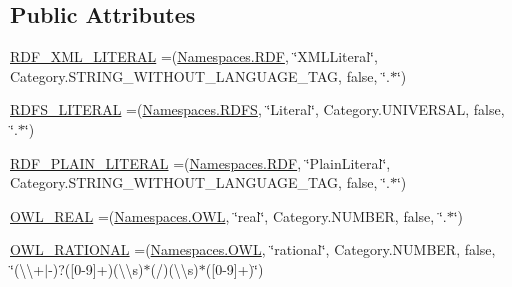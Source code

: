 \subsection*{Public Attributes}
\begin{DoxyCompactItemize}
\item 
\hyperlink{enumorg_1_1semanticweb_1_1owlapi_1_1vocab_1_1_o_w_l2_datatype_a7d12eb71e328a268cb0e6e4f4ebc2231}{R\-D\-F\-\_\-\-X\-M\-L\-\_\-\-L\-I\-T\-E\-R\-A\-L} =(\hyperlink{enumorg_1_1semanticweb_1_1owlapi_1_1vocab_1_1_namespaces_a0d1c7991e82e2b5c495bb87f1123ce30}{Namespaces.\-R\-D\-F}, \char`\"{}X\-M\-L\-Literal\char`\"{}, Category.\-S\-T\-R\-I\-N\-G\-\_\-\-W\-I\-T\-H\-O\-U\-T\-\_\-\-L\-A\-N\-G\-U\-A\-G\-E\-\_\-\-T\-A\-G, false, \char`\"{}.$\ast$\char`\"{})
\item 
\hyperlink{enumorg_1_1semanticweb_1_1owlapi_1_1vocab_1_1_o_w_l2_datatype_a4c24cef892d78edf3441707250688e38}{R\-D\-F\-S\-\_\-\-L\-I\-T\-E\-R\-A\-L} =(\hyperlink{enumorg_1_1semanticweb_1_1owlapi_1_1vocab_1_1_namespaces_a64d32d1177b8a61cc6da656defd88a5a}{Namespaces.\-R\-D\-F\-S}, \char`\"{}Literal\char`\"{}, Category.\-U\-N\-I\-V\-E\-R\-S\-A\-L, false, \char`\"{}.$\ast$\char`\"{})
\item 
\hyperlink{enumorg_1_1semanticweb_1_1owlapi_1_1vocab_1_1_o_w_l2_datatype_a9c2f197109cd73dfe3f0f251854db4c9}{R\-D\-F\-\_\-\-P\-L\-A\-I\-N\-\_\-\-L\-I\-T\-E\-R\-A\-L} =(\hyperlink{enumorg_1_1semanticweb_1_1owlapi_1_1vocab_1_1_namespaces_a0d1c7991e82e2b5c495bb87f1123ce30}{Namespaces.\-R\-D\-F}, \char`\"{}Plain\-Literal\char`\"{}, Category.\-S\-T\-R\-I\-N\-G\-\_\-\-W\-I\-T\-H\-O\-U\-T\-\_\-\-L\-A\-N\-G\-U\-A\-G\-E\-\_\-\-T\-A\-G, false, \char`\"{}.$\ast$\char`\"{})
\item 
\hyperlink{enumorg_1_1semanticweb_1_1owlapi_1_1vocab_1_1_o_w_l2_datatype_ae1bd623e8a3b1299192ee8ef7b89fe1f}{O\-W\-L\-\_\-\-R\-E\-A\-L} =(\hyperlink{enumorg_1_1semanticweb_1_1owlapi_1_1vocab_1_1_namespaces_a2fcb537074d9307ef1356ffb6a5bd6f4}{Namespaces.\-O\-W\-L}, \char`\"{}real\char`\"{}, Category.\-N\-U\-M\-B\-E\-R, false, \char`\"{}.$\ast$\char`\"{})
\item 
\hyperlink{enumorg_1_1semanticweb_1_1owlapi_1_1vocab_1_1_o_w_l2_datatype_a1a117f158c9e72c94db52c28b25d6407}{O\-W\-L\-\_\-\-R\-A\-T\-I\-O\-N\-A\-L} =(\hyperlink{enumorg_1_1semanticweb_1_1owlapi_1_1vocab_1_1_namespaces_a2fcb537074d9307ef1356ffb6a5bd6f4}{Namespaces.\-O\-W\-L}, \char`\"{}rational\char`\"{}, Category.\-N\-U\-M\-B\-E\-R, false, \char`\"{}(\textbackslash{}\textbackslash{}+$|$-\/)?(\mbox{[}0-\/9\mbox{]}+)(\textbackslash{}\textbackslash{}s)$\ast$(/)(\textbackslash{}\textbackslash{}s)$\ast$(\mbox{[}0-\/9\mbox{]}+)\char`\"{})

\end{DoxyCompactItemize}
